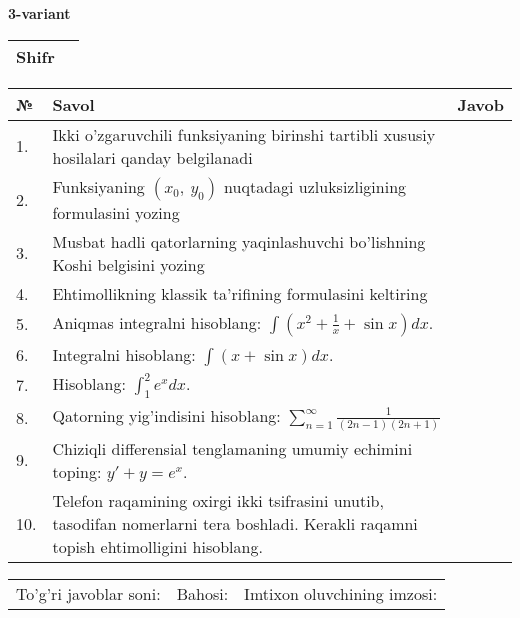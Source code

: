 \documentclass{article}
\begin{document}
  \egroup
  
  \newpage
  
  
  \textbf{3-variant}\\
  
  \bgroup
  \def\arraystretch{1.6} %
  
  \begin{tabular}{|m{5.7cm}|m{9.5cm}|}
  \hline
  Shifr & \\
  \hline
  \end{tabular}
  
  \vspace{1cm}
  
  \begin{tabular}{|m{0.7cm}|m{10cm}|m{4cm}|}
  \hline
  № & Savol & Javob \\
  \hline
  1. & Ikki o'zgaruvchili funksiyaning birinshi tartibli xususiy hosilalari qanday belgilanadi &  \\
  \hline
  2. & Funksiyaning \((x_{0},\ y_{0})\) nuqtadagi uzluksizligining formulasini yozing &  \\
  \hline
  3. & Musbat hadli qatorlarning yaqinlashuvchi bo'lishning Koshi belgisini yozing &  \\
  \hline
  4. & Ehtimollikning klassik ta'rifining formulasini keltiring &  \\
  \hline
  5. & Aniqmas integralni hisoblang: \(\int {\left( x^{2} + \frac{1}{x} + \sin x \right)dx}\). &  \\
  \hline
  6. & Integralni hisoblang: \(\int {(x + \sin x)dx}\). &  \\
  \hline
  7. & Hisoblang: \(\int_{1}^{2}{e^{x}dx}\). &  \\
  \hline
  8. & Qatorning yig'indisini hisoblang: \(\sum_{n = 1}^{\infty}\frac{1}{(2n - 1)(2n + 1)}\) &  \\
  \hline
  9. & Chiziqli differensial tenglamaning umumiy echimini toping: \(y' + y = e^{x}\). &  \\
  \hline
  10. & Telefon raqamining oxirgi ikki tsifrasini unutib, tasodifan nomerlarni tera boshladi. Kerakli raqamni topish ehtimolligini hisoblang. &  \\
  \hline
  \end{tabular}
  
  \vspace{1cm}
  
  \begin{tabular}{lll}
  To'g'ri javoblar soni: \underline{\hspace{1.5cm}} & 
  Bahosi: \underline{\hspace{1.5cm}} & 
  Imtixon oluvchining imzosi: \underline{\hspace{2cm}} \\
  \end{tabular}
  
\end{document}
